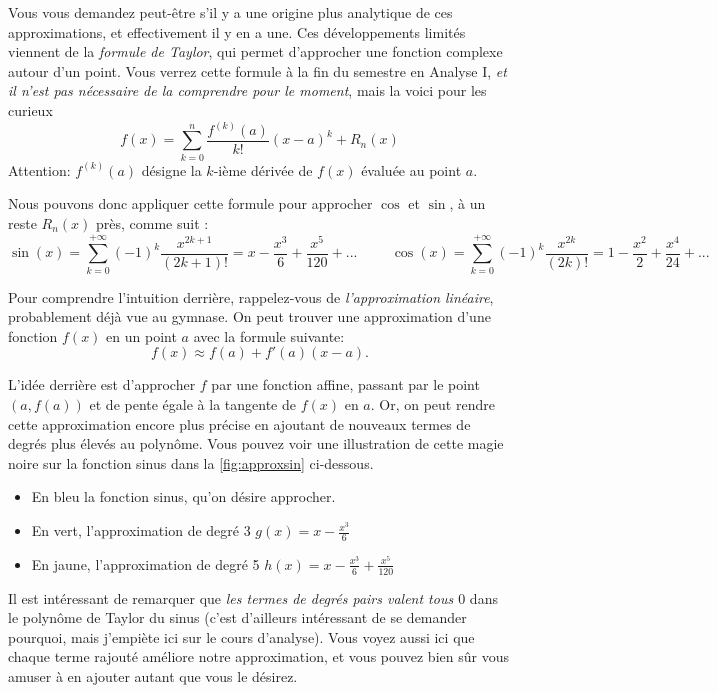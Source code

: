 \documentclass{article}
\begin{document}
Vous vous demandez peut-être s'il y a une origine plus analytique de ces approximations, et effectivement il y en a une. Ces développements limités viennent de la\textit{ formule de Taylor}, qui permet d'approcher une fonction complexe autour d'un point. Vous verrez cette formule à la fin du semestre en Analyse I, \textit{et il n'est pas nécessaire de la comprendre pour le moment}, mais la voici pour les curieux
\[f(x) = \sum_{k=0}^{n} \frac{f^{(k)}(a)}{k!}(x-a)^k + R_n(x) \]
Attention: $f^{(k)}(a)$ désigne la $k$-ième dérivée de $f(x)$ évaluée au point $a$. 


Nous pouvons donc appliquer cette formule pour approcher $\cos$ et $\sin$, à un reste $R_n(x)$ près, comme suit :
\[\sin(x) = \sum_{k = 0}^{+\infty} (-1)^k \frac{x^{2k+1}}{(2k+1)!} = x - \frac{x^3}{6} + \frac{x^5}{120} + ... \hspace{1cm}
   \cos(x) = \sum_{k = 0}^{+\infty} (-1)^k \frac{x^{2k}}{(2k)!} =  1 - \frac{x^2}{2} + \frac{x^4}{24} + ... 
\]



Pour comprendre l'intuition derrière, rappelez-vous de \textit{l'approximation linéaire}, probablement déjà vue au gymnase. On peut trouver une approximation d'une fonction $f(x) $ en un point $a$ avec la formule suivante:
\[f(x) \approx f(a) + f'(a)(x-a).\]

L'idée derrière est  d'approcher $f$ par une fonction affine, passant par le point $(a, f(a))$ et de pente égale à la tangente de $f(x)$ en $a$. Or, on peut rendre cette approximation encore plus précise en ajoutant de nouveaux termes de degrés plus élevés au polynôme. Vous pouvez voir une illustration de cette magie noire sur la fonction sinus dans la \autoref{fig:approxsin} ci-dessous. 
\begin{itemize}
    \item En bleu la fonction sinus, qu'on désire approcher. 
    \item En vert, l'approximation de degré 3 $g(x) = x - \frac{x^3}{6}$
    \item En jaune, l'approximation de degré 5 $h(x) = x - \frac{x^3}{6} + \frac{x^5}{120}$
\end{itemize}  

Il est intéressant de remarquer que \textit{les termes de degrés pairs valent tous $0$} dans le polynôme de Taylor du sinus (c'est d'ailleurs intéressant de se demander pourquoi, mais j'empiète ici sur le cours d'analyse). Vous voyez aussi ici que chaque terme rajouté améliore notre approximation, et vous pouvez bien sûr vous amuser à en ajouter autant que vous le désirez.
\end{document}
